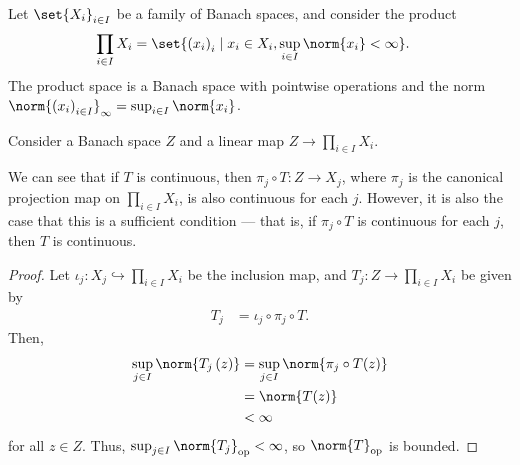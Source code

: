 \documentclass[10pt]{mypackage}
\begin{document}
  \begin{example}
    Let $\set{X_i}_{i\in I}$ be a family of Banach spaces, and consider the product
    \begin{align*}
      \prod_{i\in I}X_i &= \set{\left(x_i\right)_i\mid x_i\in X_i, \sup_{i\in I}\norm{x_i} < \infty}.
    \end{align*}
    The product space is a Banach space with pointwise operations and the norm $\norm{\left(x_i\right)_{i\in I}}_{\infty} = \sup_{i\in I}\norm{x_i}$.\newline

    Consider a Banach space $Z$ and a linear map $Z\rightarrow \prod_{i\in I}X_i$.\newline

    We can see that if $T$ is continuous, then $\pi_j\circ T: Z\rightarrow X_j$, where $\pi_j$ is the canonical projection map on $\prod_{i\in I}X_i$, is also continuous for each $j$. However, it is also the case that this is a sufficient condition --- that is, if $\pi_j\circ T$ is continuous for each $j$, then $T$ is continuous.
    \begin{proof}
      Let $\iota_j: X_j\hookrightarrow \prod_{i\in I}X_i$ be the inclusion map, and $T_j: Z\rightarrow \prod_{i\in I}X_i$ be given by
      \begin{align*}
        T_j &= \iota_j\circ \pi_j\circ T.
      \end{align*}
      Then,
      \begin{align*}
        \sup_{j\in I}\norm{T_j\left(z\right)} &= \sup_{j\in I}\norm{\pi_j\circ T(z)}\\
                                              &= \norm{T(z)}\\
                                              &< \infty
      \end{align*}
      for all $z\in Z$. Thus, $\sup_{j\in I}\norm{T_j}_{\text{op}} < \infty$, so $\norm{T}_{\text{op}}$ is bounded.
    \end{proof}
  \end{example}
\end{document}
